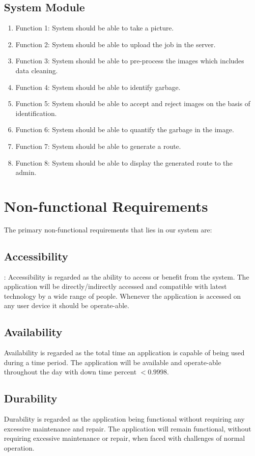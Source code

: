 \subsection{System Module}
  \begin{enumerate}
  \item Function 1: System should be able to take a picture.
  \item Function 2: System should be able to upload the job in the server.
  \item Function 3: System should be able to pre-process the images which includes data cleaning.
  \item Function 4: System should be able to identify garbage.
  \item Function 5: System should be able to accept and reject images on the basis of identification.
  \item Function 6: System should be able to quantify the garbage in the image.
  \item Function 7: System should be able to generate a route.
  \item Function 8: System should be able to display the generated route to the admin.
\end{enumerate}

\newpage
\section{Non-functional Requirements}

The primary non-functional requirements that lies in our system are:
\subsection{Accessibility}:
Accessibility is regarded as the ability to access or benefit from the system. The application will be directly/indirectly accessed and compatible with latest technology by a wide range of people. Whenever the application is accessed on any user device it should be operate-able.
\subsection{Availability}
Availability is regarded as the total time an application is capable of being used during a time period. The application will be available and operate-able throughout the day with down time percent $<0.9998$.
\subsection{Durability}
Durability is regarded as the application being functional without requiring any excessive maintenance and repair. The application will remain functional, without requiring excessive maintenance or repair, when faced with challenges of normal operation.
